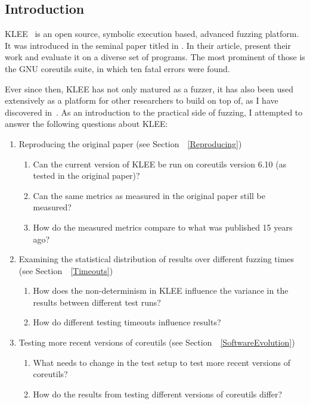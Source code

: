 \documentclass{article}
\let\savedCite=\cite
\renewcommand{\cite}{\unskip~\savedCite}
\let\savedRef=\ref
\renewcommand{\ref}{\unskip~\savedRef}
\begin{document}
\begin{multicols}{2}
    \tableofcontents

    \section{Introduction}
    KLEE\cite{KLEEWebsite} is an open source, symbolic execution based, advanced fuzzing platform. It was introduced in the seminal paper titled  in \citeyear{KLEE}. In their article, \citeauthor{KLEE} present their work and evaluate it on a diverse set of programs. The most prominent of those is the GNU coreutils suite, in which ten fatal errors were found.

    Ever since then, KLEE has not only matured as a fuzzer, it has also been used extensively as a platform for other researchers to build on top of, as I have discovered in\cite{EVA}. As an introduction to the practical side of fuzzing, I attempted to answer the following questions about KLEE:

    \begin{enumerate}
        \item Reproducing the original paper (see Section~\ref{Reproducing})
              \begin{enumerate}
                  \item Can the current version of KLEE be run on coreutils version 6.10 (as tested in the original paper)?
                  \item Can the same metrics as measured in the original paper still be measured?
                  \item How do the measured metrics compare to what was published 15 years ago?
              \end{enumerate}
        \item Examining the statistical distribution of results over different fuzzing times (see Section~\ref{Timeouts})
              \begin{enumerate}
                  \item How does the non-determinism in KLEE influence the variance in the results between different test runs?
                  \item How do different testing timeouts influence results?
              \end{enumerate}
        \item Testing more recent versions of coreutils (see Section~\ref{SoftwareEvolution})
              \begin{enumerate}
                  \item What needs to change in the test setup to test more recent versions of coreutils?
                  \item How do the results from testing different versions of coreutils differ?
              \end{enumerate}
    \end{enumerate}


\end{multicols}
\end{document}
